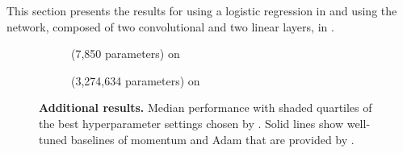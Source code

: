 This section presents the results for \MNIST using a logistic regression in
 and \FMNIST using the \FMNISTNET network,
composed of two convolutional and two linear layers, in
.

\begin{figure*}[!hp]
  \centering
  \begin{subfigure}[t]{1.0\linewidth}
    \centering
    \tikzexternalenable
    \tikzexternaldisable
    \caption{\MNISTNET (7,850 parameters) on \MNIST}\label{backpack::fig:app-mnist}
  \end{subfigure}
  \begin{subfigure}[t]{1.0\linewidth}
    \centering
    \tikzexternalenable
    \tikzexternaldisable
    \caption{\FMNISTNET (3,274,634 parameters) on \FMNIST}\label{backpack::fig:app-fmnist}
  \end{subfigure}
  \caption{%
    \textbf{Additional results.} Median performance with shaded quartiles of the
    best hyperparameter settings chosen by \DeepOBS. Solid lines show well-tuned
    baselines of momentum \SGD and Adam that are provided by \DeepOBS. }
\end{figure*}

